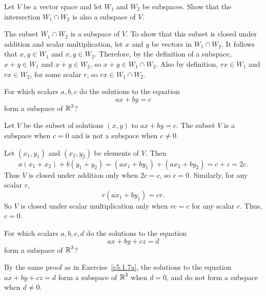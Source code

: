 \documentclass{ximera}
\begin{document}
\begin{exercise} \label{c5.1.6}
Let $V$ be a vector space and let $W_1$ and $W_2$ be subspaces.
Show that the intersection $W_1\cap W_2$ is also a subspace of $V$.

\begin{solution}

The subset $W_1 \cap W_2$ is a subspace of $V$.  To show that this
subset is closed under addition and scalar multiplication, 
let $x$ and $y$ be vectors in $W_1 \cap W_2$.  It follows that
$x,y \in W_1$ and $x,y \in W_2$.  Therefore, by the
definition of a subspace, $x + y \in W_1$ and $x + y \in W_2$, so
$x + y \in W_1 \cap W_2$.  Also by definition, $rx \in W_1$ and
$rx \in W_2$, for some scalar $r$, so $rx \in W_1 \cap W_2$.

\end{solution}
\end{exercise}

\begin{exercise} \label{c5.1.7a}
For which scalars $a,b,c$ do the solutions to the equation
\[
ax+by = c
\]
form a subspace of $\mbox{$\Bbb{R}$}^2$?

\begin{solution}

\ans Let $V$ be the subset of solutions $(x,y)$ to $ax + by = c$.
The subset $V$ is a subspace when $c = 0$ and is not a subspace
when $c \neq 0$. 

\soln Let $(x_1,y_1)$ and $(x_2,y_2)$ be elements of $V$.  Then
\[
a(x_1 + x_2) + b(y_1 + y_2) = (ax_1 + by_1) + (ax_2 + by_2) =
c + c = 2c.
\]
Thus $V$ is closed under addition only when $2c = c$, so $c = 0$.
Similarly, for any scalar $r$,
\[
r(ax_1 + by_1) = cr.
\]
So $V$ is closed under scalar multiplication only when $rc = c$ for
any scalar $r$.  Thus, $c = 0$.

\end{solution}
\end{exercise}
\begin{exercise} \label{c5.1.7b}
For which scalars $a,b,c,d$ do the solutions to the equation
\[
ax+by+cz = d
\]
form a subspace of $\mbox{$\Bbb{R}$}^3$?

\begin{solution}

\ans By the same proof as in Exercise~\ref{c5.1.7a}, the solutions to the
equation $ax + by + cz = d$ form a subspace of $\mbox{$\Bbb{R}$}^3$ when $d = 0$,
and do not form a subspace when $d \neq 0$.

\end{solution}
\end{exercise}
\end{document}
